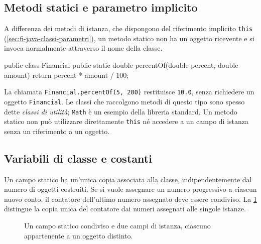 \subsection{Metodi statici e parametro implicito}
\label{sec:fi-java-cicli-metodi-statici}

A differenza dei metodi di istanza, che dispongono del riferimento
implicito \texttt{this} (\cref{sec:fi-java-classi-parametri}),
un metodo statico non ha un oggetto ricevente e si invoca
normalmente attraverso il nome della classe.

\begin{unipdcode}[language=Java]
public class Financial {
    public static double percentOf(double percent, double amount) {
        return percent * amount / 100;
    }
}
\end{unipdcode}

La chiamata \texttt{Financial.percentOf(5, 200)} restituisce
\texttt{10.0}, senza richiedere un oggetto \texttt{Financial}.
Le classi che raccolgono metodi di questo tipo sono spesso dette
\emph{classi di utilità}; \texttt{Math} è un esempio della
libreria standard. Un metodo statico non può utilizzare
direttamente \texttt{this} né accedere a un campo di istanza
senza un riferimento a un oggetto.

\subsection{Variabili di classe e costanti}
\label{sec:fi-java-cicli-campi-statici}

Un campo statico ha un'unica copia associata alla classe,
indipendentemente dal numero di oggetti costruiti. Se si vuole
assegnare un numero progressivo a ciascun nuovo conto,
il contatore dell'ultimo numero assegnato deve essere condiviso.
La \cref{fig:fi-java-cicli-statici-istanze} distingue la copia
unica del contatore dai numeri assegnati alle singole istanze.

\begin{figure}[htbp]
  \centering
  
  \caption{Un campo statico condiviso e due campi di istanza,
  ciascuno appartenente a un oggetto distinto.}
  \label{fig:fi-java-cicli-statici-istanze}
\end{figure}

\clearpage



